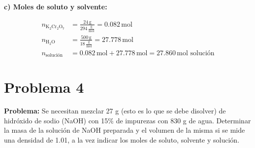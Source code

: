 \documentclass{article}
\begin{document}
\begin{multicols}{2}
\textbf{c) Moles de soluto y solvente:}

\begin{align*}
    n_{\text{K}_2\text{Cr}_2\text{O}_7} &= \frac{24 \, \text{g}}{294 \, \frac{\text{g}}{\text{mol}}} = 0.082 \, \text{mol} \\[10pt]
    n_{\text{H}_2\text{O}} &= \frac{500 \, \text{g}}{18 \, \frac{\text{g}}{\text{mol}}} = 27.778 \, \text{mol} \\[10pt]
    n_{\text{solución}} &= 0.082 \, \text{mol} + 27.778 \, \text{mol} = 27.860 \, \text{mol solución}
\end{align*}

\end{multicols} %









\newpage
\section*{Problema 4}
\textbf{Problema:}
Se necesitan mezclar 27 g (esto es lo que se debe disolver) de hidróxido de sodio (NaOH) con 15\% de impurezas con 830 g de agua. Determinar la masa de la solución de NaOH preparada y el volumen de la misma si se mide una densidad de 1.01, a la vez indicar los moles de soluto, solvente y solución.
\end{document}
